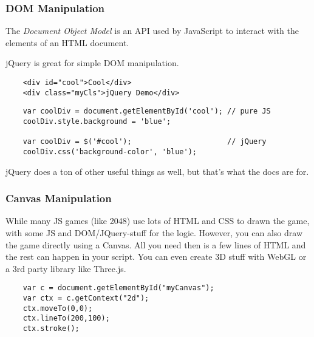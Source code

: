\documentclass{lug}
\begin{document}
\begin{frame}[fragile]
    \frametitle{DOM Manipulation}
    The \textit{Document Object Model} is an API used by JavaScript to interact with the elements of
    an HTML document.\footnotemark[1]

    jQuery is great for simple DOM manipulation.

    \begin{verbatim}
    <div id="cool">Cool</div>
    <div class="myCls">jQuery Demo</div>
    \end{verbatim}

    \begin{verbatim}
    var coolDiv = document.getElementById('cool'); // pure JS
    coolDiv.style.background = 'blue';

    var coolDiv = $('#cool');                      // jQuery
    coolDiv.css('background-color', 'blue');
    \end{verbatim}

    jQuery does a ton of other useful things as well, but that's what the docs are for.

\end{frame}

\begin{frame}[fragile]
    \frametitle{Canvas Manipulation}

    While many JS games (like 2048) use lots of HTML and CSS to drawn the
    game, with some JS and DOM/JQuery-stuff for the logic. However, you can
    also draw the game directly using a Canvas. All you need then is a few
    lines of HTML and the rest can happen in your script. You can even create
    3D stuff with WebGL or a 3rd party library like Three.js.

    \begin{verbatim}
    var c = document.getElementById("myCanvas");
    var ctx = c.getContext("2d");
    ctx.moveTo(0,0);
    ctx.lineTo(200,100);
    ctx.stroke();
     \end{verbatim}

\end{frame}
\end{document}

